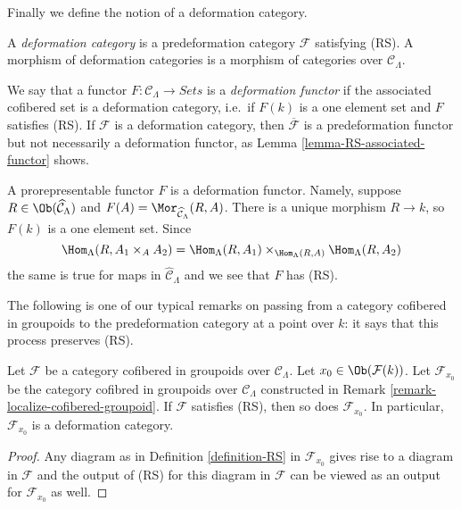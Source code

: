 \noindent
Finally we define the notion of a deformation category.

\begin{definition}
\label{definition-deformation-category}
A {\it deformation category} is a predeformation category $\mathcal{F}$
satisfying (RS). A morphism of deformation categories is a morphism of
categories over $\mathcal{C}_\Lambda$.
\end{definition}

\begin{remark}
\label{remark-deformation-functor}
We say that a functor $F: \mathcal{C}_\Lambda \to \textit{Sets}$
is a {\it deformation functor} if the associated cofibered set is a
deformation category, i.e.\ if $F(k)$ is a one element set and $F$ satisfies
(RS). If $\mathcal{F}$ is a deformation category, then
$\overline{\mathcal{F}}$
is a predeformation functor but not necessarily a deformation functor, as
Lemma \ref{lemma-RS-associated-functor} shows.
\end{remark}

\begin{example}
\label{example-prorepresentable-deformation-functor}
A prorepresentable functor $F$ is a deformation functor. Namely, suppose
$R \in \Ob(\widehat{\mathcal{C}}_\Lambda)$ and
$F(A) = \Mor_{\widehat{\mathcal{C}}_\Lambda}(R, A)$.
There is a unique morphism $R \to k$, so $F(k)$ is a one element set.
Since
$$
\Hom_\Lambda(R, A_1 \times_A A_2) =
\Hom_\Lambda(R, A_1) \times_{\Hom_\Lambda(R, A)}
\Hom_\Lambda(R, A_2)
$$
the same is true for maps in $\widehat{\mathcal{C}}_\Lambda$ and
we see that $F$ has (RS).
\end{example}

\noindent
The following is one of our typical remarks on passing from a category
cofibered in groupoids to the predeformation category at a point over $k$: it
says that this process preserves (RS).

\begin{lemma}
\label{lemma-localize-RS}
Let $\mathcal{F}$ be a category cofibered in groupoids over
$\mathcal{C}_\Lambda$. Let $x_0 \in \Ob(\mathcal{F}(k))$.
Let $\mathcal{F}_{x_0}$ be the category cofibred in groupoids over
$\mathcal{C}_\Lambda$ constructed in
Remark \ref{remark-localize-cofibered-groupoid}.
If $\mathcal{F}$ satisfies (RS), then so does $\mathcal{F}_{x_0}$.
In particular, $\mathcal{F}_{x_0}$ is a deformation category.
\end{lemma}

\begin{proof}
Any diagram as in
Definition \ref{definition-RS}
in $\mathcal{F}_{x_0}$ gives rise to a diagram in $\mathcal{F}$
and the output of (RS) for this diagram in $\mathcal{F}$
can be viewed as an output for $\mathcal{F}_{x_0}$ as well.
\end{proof}

